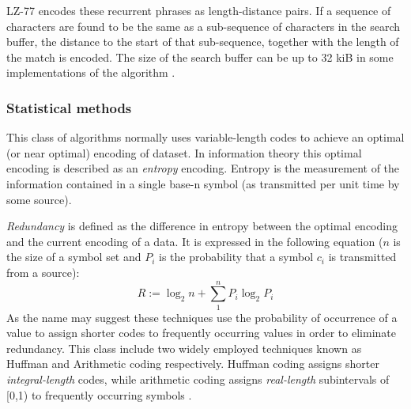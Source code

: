 LZ-77 encodes these recurrent phrases as length-distance pairs. If a sequence of characters are found to be the same as a sub-sequence of characters in the search buffer, the 
distance to the start of that sub-sequence, together with the length of the match is encoded. The size of the search buffer can be up to 32 kiB in some implementations of the 
algorithm \cite[ch. 3]{salomon2004data}.
\subsubsection{Statistical methods}
This class of algorithms normally uses variable-length codes to achieve an optimal (or near optimal) encoding of dataset. In information theory this optimal encoding is 
described as an \textit{entropy} encoding. Entropy is the measurement of the information contained in a single base-n symbol (as transmitted per unit time by some source).

\textit{Redundancy} is defined as the difference in entropy between the optimal encoding and the current encoding of a data. It is expressed in the following equation  
($n$ is the size of a symbol set and $P_{i}$ is the probability that a symbol $c_{i}$ is transmitted from a source)\cite[p. 46 - 47]{salomon2004data}:
\begin{equation}
 R := \log_2n + \sum_1^nP_i\log_2P_i
\end{equation}
As the name may suggest these techniques use the probability of occurrence of a value to assign shorter codes to frequently occurring values in order to eliminate redundancy. This 
class include two widely employed techniques known as Huffman and Arithmetic coding respectively. Huffman coding assigns shorter \textit{integral-length} codes, while arithmetic 
coding assigns \textit{real-length} subintervals of [0,1) to frequently occurring symbols \cite{Witten:1987:ACD:214762.214771}\cite[ch. 2]{salomon2004data}.

